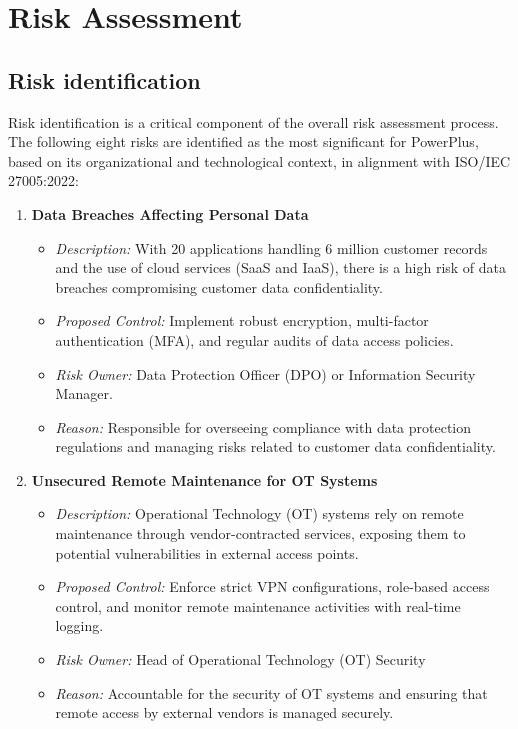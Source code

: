 \chapter{Risk Assessment}

\section{Risk identification}

Risk identification is a critical component of the overall risk assessment process. The following eight risks are identified as the most significant for PowerPlus, based on its organizational and technological context, in alignment with ISO/IEC 27005:2022:

\begin{enumerate}
    \item \textbf{Data Breaches Affecting Personal Data}
    \begin{itemize}
        \item \textit{Description:} With 20 applications handling 6 million customer records and the use of cloud services (SaaS and IaaS), there is a high risk of data breaches compromising customer data confidentiality.
        \item \textit{Proposed Control:} Implement robust encryption, multi-factor authentication (MFA), and regular audits of data access policies.
        \item \textit{Risk Owner:} Data Protection Officer (DPO) or Information Security Manager.
        \item \textit{Reason:} Responsible for overseeing compliance with data protection regulations and managing risks related to customer data confidentiality.
    \end{itemize}

    \item \textbf{Unsecured Remote Maintenance for OT Systems}
    \begin{itemize}
        \item \textit{Description:} Operational Technology (OT) systems rely on remote maintenance through vendor-contracted services, exposing them to potential vulnerabilities in external access points.
        \item \textit{Proposed Control:} Enforce strict VPN configurations, role-based access control, and monitor remote maintenance activities with real-time logging.
        \item \textit{Risk Owner:} Head of Operational Technology (OT) Security
        \item \textit{Reason:} Accountable for the security of OT systems and ensuring that remote access by external vendors is managed securely.
    \end{itemize}


\end{enumerate}
